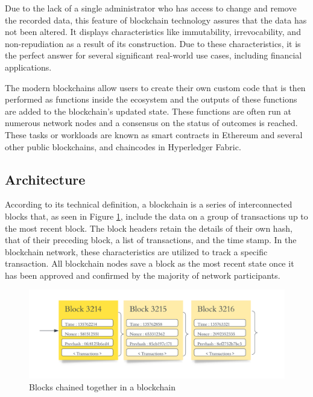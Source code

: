 \vspace{.5cm}

Due to the lack of a single administrator who has access to change and remove the recorded data, this feature of blockchain technology assures that the data has not been altered. It displays characteristics like immutability, irrevocability, and non-repudiation as a result of its construction. Due to these characteristics, it is the perfect answer for several significant real-world use cases, including financial applications.

\vspace{.5cm}

The modern blockchains allow users to create their own custom code that is then performed as functions inside the ecosystem and the outputs of these functions are added to the blockchain's updated state. These functions are often run at numerous network nodes and a consensus on the status of outcomes is reached. These tasks or workloads are known as smart contracts in Ethereum and several other public blockchains, and chaincodes in Hyperledger Fabric.


\subsection{Architecture}
According to its technical definition, a blockchain is a series of interconnected blocks that, as seen in Figure \ref{Blocks chained together in a blockchain}, include the data on a group of transactions up to the most recent block. The block headers retain the details of their own hash, that of their preceding block, a list of transactions, and the time stamp. In the blockchain network, these characteristics are utilized to track a specific transaction. All blockchain nodes save a block as the most recent state once it has been approved and confirmed by the majority of network participants.

 \vspace{.5cm}
 
\begin{figure}[h]
  \includegraphics[width=\textwidth]{includes/figures/blocks.png}
  \caption{Blocks chained together in a blockchain}
  \label{Blocks chained together in a blockchain}
\end{figure}

